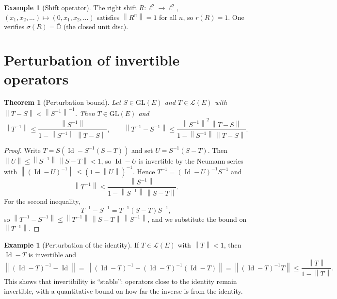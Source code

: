 \documentclass[a4paper,12pt]{book}
\DeclareMathOperator{\Id}{Id}
\newcommand{\norm}[1]{\left\| #1 \right\|}
\theoremstyle{definition}
\newtheorem{example}[definition]{Example}
\theoremstyle{plain}
\newtheorem{theorem}[definition]{Theorem}
\theoremstyle{remark}
\begin{document}
\begin{example}[Shift operator]\label{ex:spectral-radius-shift}
The right shift $R\colon\ell^2\to\ell^2$, $(x_1,x_2,\dots)\mapsto(0,x_1,x_2,\dots)$
satisfies $\norm{R^n}=1$ for all $n$, so $r(R)=1$. One verifies
$\sigma(R)=\overline{\mathbb{D}}$ (the closed unit disc).
\end{example}

\section{Perturbation of invertible operators}

\begin{theorem}[Perturbation bound]\label{thm:perturbation}
Let $S\in\mathrm{GL}(E)$ and $T\in\mathcal{L}(E)$ with
$\norm{T-S}<\norm{S^{-1}}^{-1}$. Then $T\in\mathrm{GL}(E)$ and
\[
  \norm{T^{-1}} \leq \frac{\norm{S^{-1}}}{1-\norm{S^{-1}}\,\norm{T-S}},
  \qquad
  \norm{T^{-1}-S^{-1}} \leq
  \frac{\norm{S^{-1}}^2\,\norm{T-S}}{1-\norm{S^{-1}}\,\norm{T-S}}.
\]
\end{theorem}

\begin{proof}
Write $T = S(\Id - S^{-1}(S-T))$ and set $U = S^{-1}(S-T)$. Then
$\norm{U}\leq\norm{S^{-1}}\,\norm{S-T}<1$, so $\Id-U$ is invertible by the
Neumann series with $\norm{(\Id-U)^{-1}}\leq(1-\norm{U})^{-1}$. Hence
$T^{-1}=(\Id-U)^{-1}S^{-1}$ and
\[
  \norm{T^{-1}} \leq \frac{\norm{S^{-1}}}{1-\norm{S^{-1}}\,\norm{S-T}}.
\]
For the second inequality,
\[
  T^{-1}-S^{-1} = T^{-1}(S-T)S^{-1},
\]
so $\norm{T^{-1}-S^{-1}}\leq\norm{T^{-1}}\,\norm{S-T}\,\norm{S^{-1}}$, and
we substitute the bound on $\norm{T^{-1}}$.
\end{proof}

\begin{example}[Perturbation of the identity]\label{ex:perturbation-identity}
If $T\in\mathcal{L}(E)$ with $\norm{T}<1$, then $\Id-T$ is invertible and
\[
  \norm{(\Id-T)^{-1}-\Id} = \norm{(\Id-T)^{-1}-(\Id-T)^{-1}(\Id-T)}
  = \norm{(\Id-T)^{-1}T} \leq \frac{\norm{T}}{1-\norm{T}}.
\]
This shows that invertibility is ``stable'': operators close to the identity
remain invertible, with a quantitative bound on how far the inverse is from the
identity.
\end{example}
\end{document}
